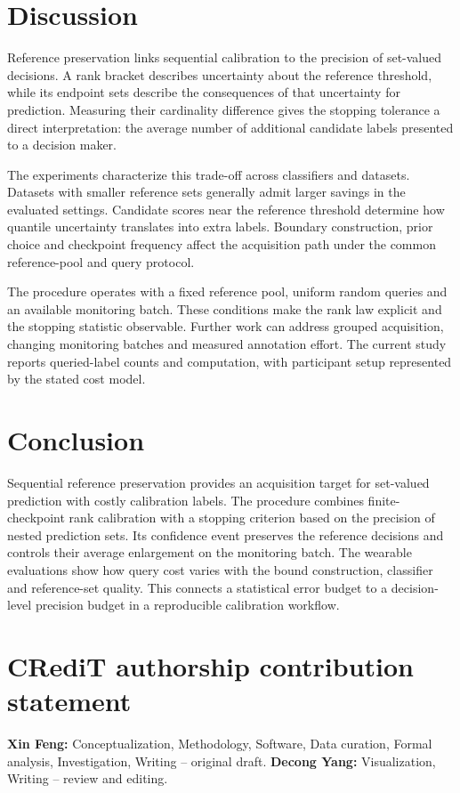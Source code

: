 \documentclass[preprint,12pt]{elsarticle}
\begin{document}
\section{Discussion}
Reference preservation links sequential calibration to the precision of set-valued decisions. A rank bracket describes uncertainty about the reference threshold, while its endpoint sets describe the consequences of that uncertainty for prediction. Measuring their cardinality difference gives the stopping tolerance a direct interpretation: the average number of additional candidate labels presented to a decision maker.

The experiments characterize this trade-off across classifiers and datasets. Datasets with smaller reference sets generally admit larger savings in the evaluated settings. Candidate scores near the reference threshold determine how quantile uncertainty translates into extra labels. Boundary construction, prior choice and checkpoint frequency affect the acquisition path under the common reference-pool and query protocol.

The procedure operates with a fixed reference pool, uniform random queries and an available monitoring batch. These conditions make the rank law explicit and the stopping statistic observable. Further work can address grouped acquisition, changing monitoring batches and measured annotation effort. The current study reports queried-label counts and computation, with participant setup represented by the stated cost model.

\section{Conclusion}
Sequential reference preservation provides an acquisition target for set-valued prediction with costly calibration labels. The procedure combines finite-checkpoint rank calibration with a stopping criterion based on the precision of nested prediction sets. Its confidence event preserves the reference decisions and controls their average enlargement on the monitoring batch. The wearable evaluations show how query cost varies with the bound construction, classifier and reference-set quality. This connects a statistical error budget to a decision-level precision budget in a reproducible calibration workflow.

\section*{CRediT authorship contribution statement}
\textbf{Xin Feng:} Conceptualization, Methodology, Software, Data curation, Formal analysis, Investigation, Writing -- original draft. \textbf{Decong Yang:} Visualization, Writing -- review and editing.
\end{document}
